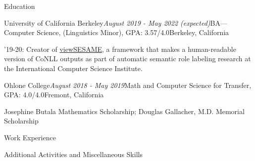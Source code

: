 \documentclass{resume} %
\begin{document}

\begin{rSection}{Education}
\begin{rSubsection}{University of California Berkeley}{\em August 2019 - May 2022 (expected)}{BA---Computer Science, (Linguistics Minor), GPA: 3.57/4.0}{Berkeley, California}
\item '19-20: Creator of \href{https://github.com/citronella3alain/view-sesame}{viewSESAME}, a framework that makes a human-readable version of CoNLL outputs as part of automatic semantic role labeling research at the International Computer Science Institute.
\end{rSubsection}
\begin{rSubsection}{Ohlone College}{\em August 2018 - May 2019}{Math and Computer Science for Transfer, GPA: 4.0/4.0}{Fremont, California}
\item Josephine Butala Mathematics Scholarship; Douglas Gallacher, M.D. Memorial Scholarship
\end{rSubsection}
\end{rSection}
\begin{rSection}{Work Experience}




%
\end{rSection}
\begin{rSection}{Additional Activities and Miscellaneous Skills}

\end{rSection}
\end{document}
